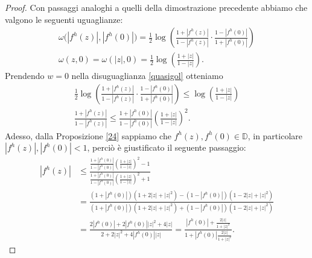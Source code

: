 \begin{proof}
  Con passaggi analoghi a quelli della dimostrazione precedente abbiamo che valgono le seguenti uguaglianze:
  \begin{gather*}
    \omega\bigl(|f^h(z)|,|f^h(0)|\bigr)=\frac{1}{2}\log\left(\frac{1+|f^h(z)|}{1-|f^h(z)|}\cdot\frac{1-|f^h(0)|}{1+|f^h(0)|}\right)\\
    \omega(z, 0)=\omega(|z|,0)=\frac{1}{2}\log\left(\frac{1+|z|}{1-|z|}\right).
  \end{gather*}
  Prendendo $w=0$ nella disuguaglianza \eqref{quasigol} otteniamo
  \begin{align*}
    \frac{1}{2}\log\left(\frac{1+|f^h(z)|}{1-|f^h(z)|}\cdot\frac{1-|f^h(0)|}{1+|f^h(0)|}\right) \le \log\left(\frac{1+|z|}{1-|z|}\right) \\
    \frac{1+|f^h(z)|}{1-|f^h(z)|} \le \frac{1+|f^h(0)|}{1-|f^h(0)|}\left(\frac{1+|z|}{1-|z|}\right)^2.
  \end{align*}
  Adesso, dalla Proposizione \ref{24} sappiamo che $f^h(z),f^h(0) \in \mathbb{D}$, in particolare $|f^h(z)|,|f^h(0)|<1$, perciò è giustificato il seguente passaggio:
  \begin{align*}
    |f^h(z)| & \le \frac{\frac{1+|f^h(0)|}{1-|f^h(0)|}\left(\frac{1+|z|}{1-|z|}\right)^2-1}{\frac{1+|f^h(0)|}{1-|f^h(0)|}\left(\frac{1+|z|}{1-|z|}\right)^2+1} \\
    & =\frac{(1+|f^h(0)|)(1+2|z|+|z|^2)-(1-|f^h(0)|)(1-2|z|+|z|^2)}{(1+|f^h(0)|)(1+2|z|+|z|^2)+(1-|f^h(0)|)(1-2|z|+|z|^2)} \\
    & =\frac{2|f^h(0)|+2|f^h(0)||z|^2+4|z|}{2+2|z|^2+4|f^h(0)||z|}=\frac{|f^h(0)|+\frac{2|z|}{1+|z|^2}}{1+|f^h(0)|\frac{2|z|}{1+|z|^2}}.
  \end{align*}
\end{proof}
